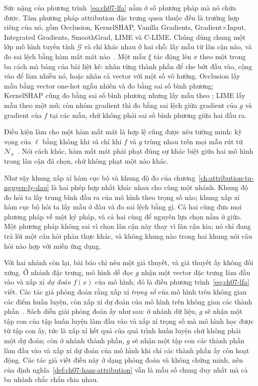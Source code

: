 Sức nặng của phương trình~\ref{eq:ch07-lfa} nằm ở số phương pháp mà nó chứa
được. Tám phương pháp attribution đặc trưng quen thuộc đều là trường hợp
riêng của nó, gồm Occlusion, KernelSHAP, Vanilla Gradients, Gradient$\mathbin{\times}$Input,
Integrated Gradients, SmoothGrad, LIME và C-LIME. Chúng dùng chung một lớp mô
hình tuyến tính $\mathcal{G}$ và chỉ khác nhau ở hai chỗ: lấy mẫu từ lân cận
nào, và đo sai lệch bằng hàm mất mát nào~\autocite{p18unified}. Một mẫu $\xi$
tác động lên $x$ theo một trong ba cách mà bảng của bài liệt kê: nhân từng thành
phần để che bớt đầu vào, cộng vào để làm nhiễu nó, hoặc nhân cả vector với một
số vô hướng. Occlusion lấy
mẫu bằng vector one-hot ngẫu nhiên và đo bằng sai số bình phương; KernelSHAP
cũng đo bằng sai số bình phương nhưng lấy mẫu theo ;
LIME lấy mẫu theo một  mũ; còn nhóm gradient thì đo bằng
sai lệch giữa gradient của $g$ và gradient của $f$ tại các mẫu, chứ không phải
sai số bình phương giữa hai đầu ra.

Điều kiện làm cho một hàm mất mát là hợp lệ cũng được nêu tường minh: kỳ vọng
của $\ell$ bằng không khi và chỉ khi $f$ và $g$ trùng nhau trên mọi mẫu rút từ
$\mathcal{N}_x$~\autocite{p18unified}. Nói cách khác, hàm mất mát phải phạt đúng
sự khác biệt giữa hai mô hình trong lân cận đã chọn, chứ không phạt một
 nào khác.

Như vậy khung xấp xỉ hàm cục bộ và khung độ đo của
chương~\ref{ch:attribution-tu-nguyen-ly-dau} là hai phép hợp nhất khác nhau cho
cùng một nhánh. Khung độ đo hỏi ta lấy trung bình đầu ra của mô hình theo trọng
số nào; khung xấp xỉ hàm cục bộ hỏi ta lấy mẫu ở đâu và đo sai lệch bằng gì. Cả
hai cùng đưa mọi phương pháp về một ký pháp, và cả hai cùng để nguyên lựa chọn
nằm ở giữa. Một phương pháp không sai vì chọn lân cận này thay vì lân cận kia;
nó chỉ đang trả lời một câu hỏi phản thực khác, và không khung nào trong hai
khung nói câu hỏi nào hợp với miền ứng dụng.

Với hai nhánh còn lại, bài báo chỉ nêu một giả thuyết, và giả thuyết ấy không
đối xứng. Ở nhánh đặc trưng, mô hình dễ đọc $g$ nhận một vector đặc trưng làm
đầu vào và xấp xỉ \emph{dự đoán} $f(x)$ của mô hình; đó là điều
phương trình~\ref{eq:ch07-lfa} viết. Các tác giả phỏng đoán rằng
 xấp xỉ \emph{trọng số} của mô hình
trên không gian các điểm huấn luyện, còn
 xấp xỉ dự đoán của mô hình
trên không gian các thành phần~\autocite{p18unified}. Sách diễn giải phỏng đoán ấy như sau: ở
nhánh dữ liệu, $g$ sẽ nhận một tập con của tập huấn luyện làm đầu vào và xấp
xỉ trọng số mà mô hình học được từ tập con ấy, tức là xấp xỉ kết quả của quá
trình huấn luyện chứ không phải một dự đoán; còn ở nhánh thành phần, $g$ sẽ
nhận một tập con các thành phần làm đầu vào và xấp xỉ dự đoán của mô hình khi
chỉ các thành phần ấy còn hoạt động. Các tác giả viết điều này ở dạng phỏng
đoán và không chứng minh, nên
 của
định nghĩa~\ref{def:ch07-ham-attribution} vẫn là mẫu số chung duy nhất mà cả
ba nhánh chắc chắn chia nhau.
